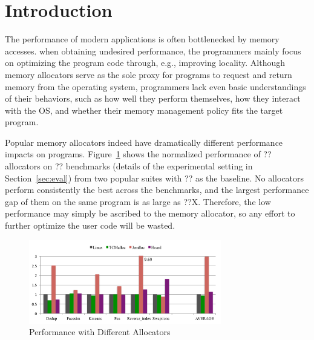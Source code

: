 

\section{Introduction}


The performance of modern applications is often bottlenecked by memory accesses. when obtaining undesired performance, the programmers mainly focus on optimizing the program code through, e.g., improving locality. Although memory allocators serve as the sole proxy for programs to request and return memory from the operating system, programmers lack even basic understandings of their behaviors, such as how well they perform themselves, how they interact with the OS, and whether their memory management policy fits the target program. 

Popular memory allocators indeed have dramatically different performance impacts on programs. Figure~\ref{fig:motivation} shows the normalized performance of ?? allocators on ?? benchmarks (details of the experimental setting in Section~\ref{sec:eval}) from two popular suites with ?? as the baseline. No allocators perform consistently the best across the benchmarks, and the largest performance gap of them on the same program is as large as ??X. Therefore, the low performance may simply be ascribed to the memory allocator, so any effort to further optimize the user code will be wasted.

\begin{figure}[!ht]
\centering
\includegraphics[width=3.3in]{figures/motivation}
\caption{Performance with Different Allocators\label{fig:motivation}}
\end{figure}

